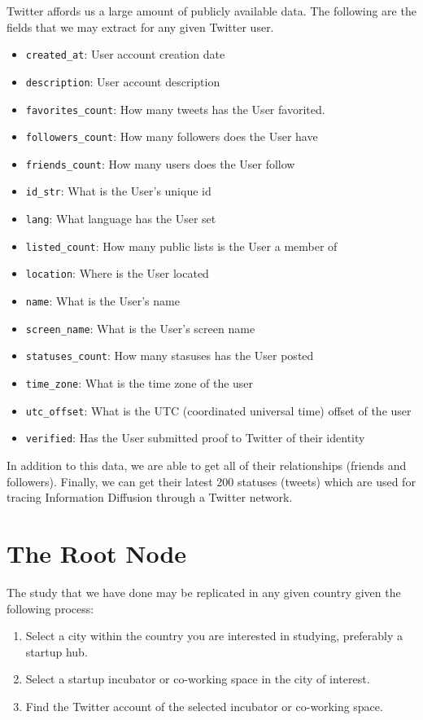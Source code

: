 Twitter affords us a large amount of publicly available data. The
following are the fields that we may extract for any given Twitter
user.

\begin{itemize}
\item \verb|created_at|: User account creation date
\item \verb|description|: User account description
\item \verb|favorites_count|: How many tweets has the User favorited.
\item \verb|followers_count|: How many followers does the User have
\item \verb|friends_count|: How many users does the User follow
\item \verb|id_str|: What is the User's unique id
\item \verb|lang|: What language has the User set
\item \verb|listed_count|: How many public lists is the User a member of
\item \verb|location|: Where is the User located
\item \verb|name|: What is the User's name
\item \verb|screen_name|: What is the User's screen name
\item \verb|statuses_count|: How many stasuses has the User posted
\item \verb|time_zone|: What is the time zone of the user
\item \verb|utc_offset|: What is the UTC (coordinated universal time) offset of the user
\item \verb|verified|: Has the User submitted proof to Twitter of their identity
\end{itemize}

In addition to this data, we are able to get all of their
relationships (friends and followers). Finally, we can get their
latest 200 statuses (tweets) which are used for tracing Information
Diffusion through a Twitter network.

\section{The Root Node}
The study that we have done may be replicated in any given country
given the following process:

\begin{enumerate}
\item Select a city within the country you are interested in studying,
  preferably a startup hub.
\item Select a startup incubator or co-working space in the city of
  interest.
\item Find the Twitter account of the selected incubator or co-working
  space.
\end{enumerate}

